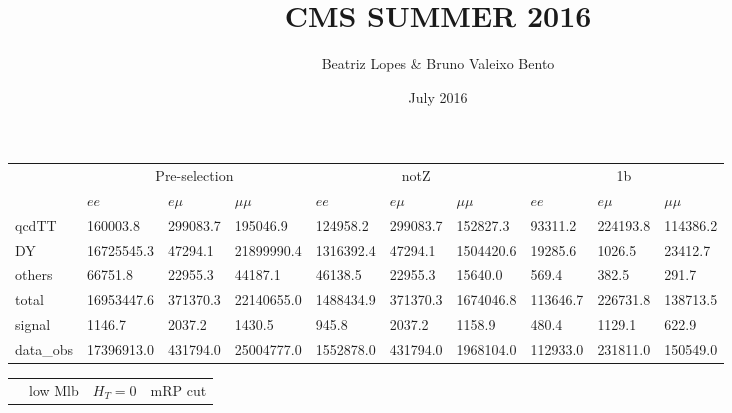 \documentclass{article}
\title{CMS SUMMER 2016}
\author{Beatriz Lopes &  Bruno Valeixo Bento}
\date{July 2016}
\begin{document}
\begin{landscape}
\maketitle
\begin{table}[!h]
\centering
\begin{tabular}{l||l|l|l||l|l|l||l|l|l|}
 & \multicolumn{3}{c||}{\cellcolor[HTML]{EFEFEF} Pre-selection} & \multicolumn{3}{c||}{\cellcolor[HTML]{EFEFEF} notZ} & \multicolumn{3}{c||}{\cellcolor[HTML]{EFEFEF} 1b}\\ \cline{2-10} 
& $ee$ & $e\mu$ & $\mu\mu$ & $ee$ & $e\mu$ & $\mu\mu$ & $ee$ & $e\mu$ & $\mu\mu$ \\ \hline 
\cellcolor[HTML]{EFEFEF} qcdTT &        160003.8 &        299083.7 &        195046.9 &        124958.2 &        299083.7 &        152827.3 &         93311.2 &        224193.8 &        114386.2\\ \hline 
\cellcolor[HTML]{EFEFEF} DY &      16725545.3 &         47294.1 &      21899990.4 &       1316392.4 &         47294.1 &       1504420.6 &         19285.6 &          1026.5 &         23412.7\\ \hline 
\cellcolor[HTML]{EFEFEF} others &         66751.8 &         22955.3 &         44187.1 &         46138.5 &         22955.3 &         15640.0 &           569.4 &           382.5 &           291.7\\ \hline 
\cellcolor[HTML]{EFEFEF} total &      16953447.6 &        371370.3 &      22140655.0 &       1488434.9 &        371370.3 &       1674046.8 &        113646.7 &        226731.8 &        138713.5\\ \hline 
\cellcolor[HTML]{EFEFEF} signal &          1146.7 &          2037.2 &          1430.5 &           945.8 &          2037.2 &          1158.9 &           480.4 &          1129.1 &           622.9\\ \hline 
\cellcolor[HTML]{EFEFEF} data_obs &      17396913.0 &        431794.0 &      25004777.0 &       1552878.0 &        431794.0 &       1968104.0 &        112933.0 &        231811.0 &        150549.0\\ \hline 
\end{tabular}
\end{table}
\begin{table}[!h]
\centering
\begin{tabular}{l||l|l|l||l|l|l||l|l|l|}
 & \multicolumn{3}{l||}{low Mlb} & \multicolumn{3}{l||}{$H_T=0$} & \multicolumn{3}{l||}{mRP cut}\\ \cline{2-10} 

\end{tabular}
\end{table}
\end{landscape}
\end{document}
